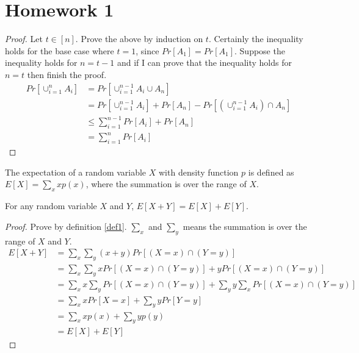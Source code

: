 \section{Homework 1}
\begin{proof}
Let $t \in [n]$.
Prove the above by induction on $t$.
Certainly the inequality holds for the base case where $t=1$, since $Pr[A_1]=Pr[A_1]$.
Suppose the inequality holds for $n=t-1$ and if I can prove that the inequality holds for $n=t$ then finish the proof.
\begin{align}
    \nonumber Pr[\cup_{i=1}^{n}A_i]&=Pr[\cup_{i=1}^{n-1}A_i\cup A_n]\\
    \nonumber&= Pr[\cup_{i=1}^{n-1}A_i]+Pr[A_n]-Pr[(\cup_{i=1}^{n-1}A_i)\cap A_n]\\
    \nonumber&\le \sum_{i=1}^{n-1}Pr[A_i]+Pr[A_n]\\
    \nonumber&=\sum_{i=1}^{n}Pr[A_i]
\end{align}
\end{proof}
\noindent{}
\cite{linearity}
\begin{definition}\label{def1}
The expectation of a random variable $X$ with density function $p$ is defined as $E[X] = \sum_x xp(x)$, where the summation is over the range of $X$.
\end{definition}
\begin{lemma}\label{lemma2}
For any random variable $X$ and $Y$, $E[X+Y]=E[X]+E[Y]$.
\end{lemma}
\begin{proof}
Prove by definition \ref{def1}.
$\sum_x$ and $\sum_y$ means the summation is over the range of $X$ and $Y$.
\begin{align}
    \nonumber E[X+Y]&=\sum_x\sum_y(x+y)Pr[(X=x)\cap(Y=y)]\\
    \nonumber&=\sum_x\sum_yxPr[(X=x)\cap(Y=y)]+yPr[(X=x)\cap(Y=y)]\\
    \nonumber&=\sum_xx\sum_yPr[(X=x)\cap(Y=y)]+\sum_yy\sum_xPr[(X=x)\cap(Y=y)]\\
    \nonumber&=\sum_xxPr[X=x]+\sum_yyPr[Y=y]\\
    \nonumber&=\sum_xxp(x)+\sum_yyp(y)\\
    \nonumber&=E[X]+E[Y]
\end{align}
\end{proof}
